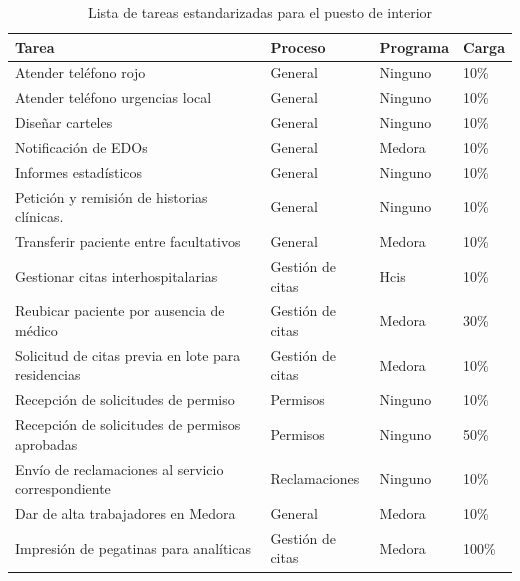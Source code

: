 \begin{table}
    \centering
    \begin{tabular}{p{8cm}lll}
        \toprule
        Tarea                                                & Proceso          & Programa & Carga \\
        \midrule
        Atender teléfono rojo                                & General          & Ninguno  & 10\%  \\
        Atender teléfono urgencias local                     & General          & Ninguno  & 10\%  \\
        Diseñar carteles                                     & General          & Ninguno  & 10\%  \\
        Notificación de EDOs                                 & General          & Medora   & 10\%  \\
        Informes estadísticos                                & General          & Ninguno  & 10\%  \\
        Petición y remisión de historias clínicas.           & General          & Ninguno  & 10\%  \\
        Transferir paciente entre facultativos               & General          & Medora   & 10\%  \\
        Gestionar citas interhospitalarias                   & Gestión de citas & Hcis     & 10\%  \\
        Reubicar paciente por ausencia de médico             & Gestión de citas & Medora   & 30\%  \\
        Solicitud de citas previa en lote para   residencias & Gestión de citas & Medora   & 10\%  \\
        Recepción de solicitudes de permiso                  & Permisos         & Ninguno  & 10\%  \\
        Recepción de solicitudes de permisos aprobadas       & Permisos         & Ninguno  & 50\%  \\
        Envío de reclamaciones al servicio correspondiente   & Reclamaciones    & Ninguno  & 10\%  \\
        Dar de alta trabajadores en Medora                   & General          & Medora   & 10\%  \\
        Impresión  de pegatinas para analíticas              & Gestión de citas & Medora   & 100\% \\
        \bottomrule
    \end{tabular}
    \caption{Lista de tareas estandarizadas para el puesto de interior}
    \label{tab:tareas-interior}
\end{table}

